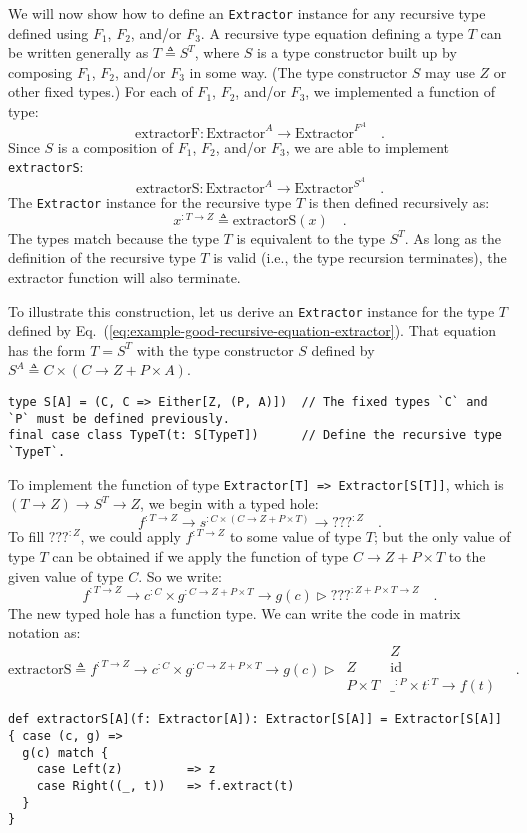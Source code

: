 We will now show how to define an \lstinline!Extractor! instance
for any recursive type defined using $F_{1}$, $F_{2}$, and/or $F_{3}$.
A recursive type equation defining a type $T$ can be written generally
as $T\triangleq S^{T}$, where $S$ is a type constructor built up
by composing $F_{1}$, $F_{2}$, and/or $F_{3}$ in some way. (The
type constructor $S$ may use $Z$ or other fixed types.) For each
of $F_{1}$, $F_{2}$, and/or $F_{3}$, we implemented a function
of type:
\[
\text{extractorF}:\text{Extractor}^{A}\rightarrow\text{Extractor}^{F^{A}}\quad.
\]
Since $S$ is a composition of $F_{1}$, $F_{2}$, and/or $F_{3}$,
we are able to implement \lstinline!extractorS!:
\[
\text{extractorS}:\text{Extractor}^{A}\rightarrow\text{Extractor}^{S^{A}}\quad.
\]
The \lstinline!Extractor! instance for the recursive type $T$ is
then defined recursively as:
\[
x^{:T\rightarrow Z}\triangleq\text{extractorS}\left(x\right)\quad.
\]
The types match because the type $T$ is equivalent to the type $S^{T}$.
As long as the definition of the recursive type $T$ is valid (i.e.,
the type recursion terminates), the extractor function will also terminate.

To illustrate this construction, let us derive an \lstinline!Extractor!
instance for the type $T$ defined by Eq.~(\ref{eq:example-good-recursive-equation-extractor}).
That equation has the form $T=S^{T}$ with the type constructor $S$
defined by $S^{A}\triangleq C\times\left(C\rightarrow Z+P\times A\right)$.
\begin{lstlisting}
type S[A] = (C, C => Either[Z, (P, A)])  // The fixed types `C` and `P` must be defined previously.
final case class TypeT(t: S[TypeT])      // Define the recursive type `TypeT`. 
\end{lstlisting}
To implement the function of type \lstinline!Extractor[T] => Extractor[S[T]]!,
which is $\left(T\rightarrow Z\right)\rightarrow S^{T}\rightarrow Z$,
we begin with a typed hole:
\[
f^{:T\rightarrow Z}\rightarrow s^{:C\times\left(C\rightarrow Z+P\times T\right)}\rightarrow\text{???}^{:Z}\quad.
\]
To fill $\text{???}^{:Z}$, we could apply $f^{:T\rightarrow Z}$
to some value of type $T$; but the only value of type $T$ can be
obtained if we apply the function of type $C\rightarrow Z+P\times T$
to the given value of type $C$. So we write:
\[
f^{:T\rightarrow Z}\rightarrow c^{:C}\times g^{:C\rightarrow Z+P\times T}\rightarrow g(c)\triangleright\text{???}^{:Z+P\times T\rightarrow Z}\quad.
\]
The new typed hole has a function type. We can write the code in matrix
notation as:
\[
\text{extractorS}\triangleq f^{:T\rightarrow Z}\rightarrow c^{:C}\times g^{:C\rightarrow Z+P\times T}\rightarrow g(c)\triangleright\,\begin{array}{|c||c|}
 & Z\\
\hline Z & \text{id}\\
P\times T & \_^{:P}\times t^{:T}\rightarrow f(t)
\end{array}\quad.
\]
\begin{lstlisting}
def extractorS[A](f: Extractor[A]): Extractor[S[A]] = Extractor[S[A]] { case (c, g) =>
  g(c) match {
    case Left(z)         => z
    case Right((_, t))   => f.extract(t)
  }
}
\end{lstlisting}

